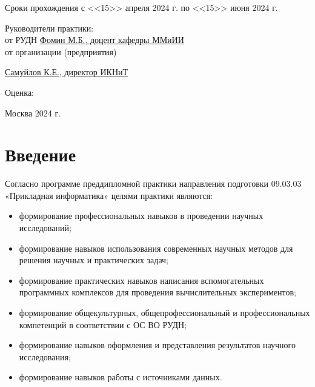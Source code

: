 \documentclass{article}
\begin{document}
\begin{titlepage}
    Сроки прохождения с <<15>> апреля 2024 г. по <<15>> июня 2024 г.

    \vspace*{\fill}

    \begin{adjustwidth}{0.4\textwidth}{0pt}
      Руководители практики:\\

      от РУДН \underline{Фомин М.Б., доцент  кафедры ММиИИ}\\

      от организации (предприятия)

      \underline{Самуйлов К.Е., директор ИКНиТ}
       
    \end{adjustwidth}
    \vspace{1em}
    
    Оценка: \underline{\phantom{1234567890 баллов}}

    \vspace*{\fill}
     
    \centering Москва 2024 г.
    \thispagestyle{empty} %
     
\end{titlepage}

    
    \newpage

    \tableofcontents

    \newpage

\section{Введение}

Согласно программе преддипломной практики направления подготовки 09.03.03 «Прикладная информатика» целями практики являются:
\begin{itemize}
\item формирование профессиональных навыков в проведении научных исследований;
\item формирование навыков использования современных научных методов для решения научных и практических задач;
\item формирование практических навыков написания вспомогательных программных комплексов для проведения вычислительных экспериментов;
\item формирование общекультурных, общепрофессиональный и профессиональных компетенций в соответствии с ОС ВО РУДН;
\item формирование навыков оформления и представления результатов научного исследования;
\item формирование навыков работы с источниками данных.
\end{itemize}
\end{document}
